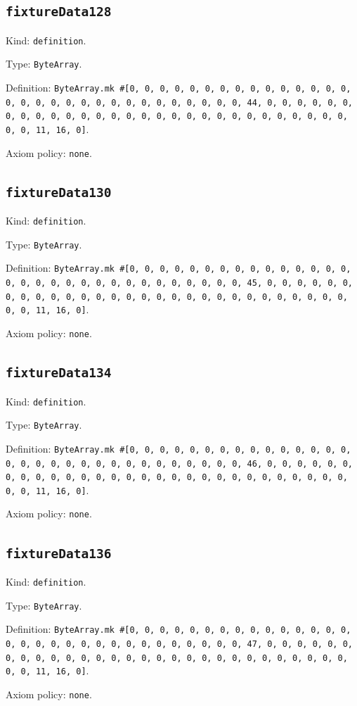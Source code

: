 \documentclass[11pt]{article}
\begin{document}
\subsection*{\texttt{fixtureData128}}
\noindent Kind: \texttt{definition}.\par
\noindent Type: \texttt{ByteArray}.\par
\noindent Definition: \texttt{ByteArray.mk \#[0, 0, 0, 0, 0, 0, 0, 0, 0, 0, 0, 0, 0, 0, 0, 0, 0, 0, 0, 0, 0, 0, 0, 0, 0, 0, 0, 0, 0, 0, 0, 44, 0, 0, 0, 0, 0, 0, 0, 0, 0, 0, 0, 0, 0, 0, 0, 0, 0, 0, 0, 0, 0, 0, 0, 0, 0, 0, 0, 0, 0, 0, 0, 11, 16, 0]}.\par
\noindent Axiom policy: \texttt{none}.\par
\subsection*{\texttt{fixtureData130}}
\noindent Kind: \texttt{definition}.\par
\noindent Type: \texttt{ByteArray}.\par
\noindent Definition: \texttt{ByteArray.mk \#[0, 0, 0, 0, 0, 0, 0, 0, 0, 0, 0, 0, 0, 0, 0, 0, 0, 0, 0, 0, 0, 0, 0, 0, 0, 0, 0, 0, 0, 0, 0, 45, 0, 0, 0, 0, 0, 0, 0, 0, 0, 0, 0, 0, 0, 0, 0, 0, 0, 0, 0, 0, 0, 0, 0, 0, 0, 0, 0, 0, 0, 0, 0, 11, 16, 0]}.\par
\noindent Axiom policy: \texttt{none}.\par
\subsection*{\texttt{fixtureData134}}
\noindent Kind: \texttt{definition}.\par
\noindent Type: \texttt{ByteArray}.\par
\noindent Definition: \texttt{ByteArray.mk \#[0, 0, 0, 0, 0, 0, 0, 0, 0, 0, 0, 0, 0, 0, 0, 0, 0, 0, 0, 0, 0, 0, 0, 0, 0, 0, 0, 0, 0, 0, 0, 46, 0, 0, 0, 0, 0, 0, 0, 0, 0, 0, 0, 0, 0, 0, 0, 0, 0, 0, 0, 0, 0, 0, 0, 0, 0, 0, 0, 0, 0, 0, 0, 11, 16, 0]}.\par
\noindent Axiom policy: \texttt{none}.\par
\subsection*{\texttt{fixtureData136}}
\noindent Kind: \texttt{definition}.\par
\noindent Type: \texttt{ByteArray}.\par
\noindent Definition: \texttt{ByteArray.mk \#[0, 0, 0, 0, 0, 0, 0, 0, 0, 0, 0, 0, 0, 0, 0, 0, 0, 0, 0, 0, 0, 0, 0, 0, 0, 0, 0, 0, 0, 0, 0, 47, 0, 0, 0, 0, 0, 0, 0, 0, 0, 0, 0, 0, 0, 0, 0, 0, 0, 0, 0, 0, 0, 0, 0, 0, 0, 0, 0, 0, 0, 0, 0, 11, 16, 0]}.\par
\noindent Axiom policy: \texttt{none}.\par
\end{document}
